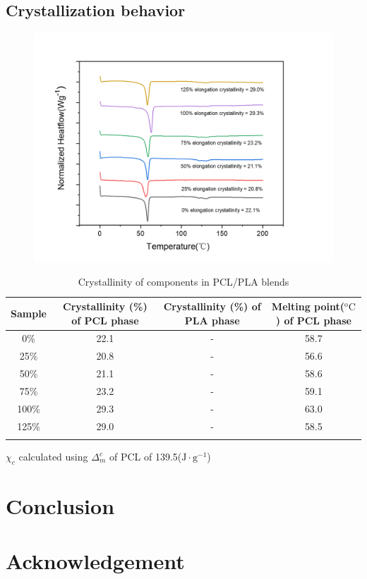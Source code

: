 \documentclass{article}%
\begin{document}
    \subsection{Crystallization behavior}
    \begin{figure} %
      \includegraphics[scale = 0.5]{figures/DSC_result_1.png}
    \end{figure}
    \label{sec:result_and_Analysis}
    \renewcommand{\tablename}{\textbf{Table}}
    \captionsetup[table]{labelsep = period}
    \begin{table} %
      \caption{Crystallinity of components in PCL/PLA blends}
      \begin{tabular}{cccc}
      \toprule
      Sample & Crystallinity (\%) of PCL phase & Crystallinity (\%) of PLA phase & Melting point($\mathrm{^o C}$) of PCL phase\\
      \midrule
      0\% & 22.1 & - & 58.7\\
      25\% & 20.8 & - & 56.6\\
      50\% & 21.1 & - & 58.6\\
      75\% & 23.2 & - & 59.1\\
      100\% & 29.3 & - & 63.0 \\
      125\% & 29.0 & - & 58.5 \\
      \bottomrule
      \label{DSC_result_table}
      \end{tabular}
      $\chi_c $ calculated using $\Delta_m^c$ of PCL of 139.5($\mathrm{J\cdot g^{-1}}$)
    \end{table}
  \section{Conclusion} %
  \label{sec:conclusion}
  
  \section{Acknowledgement} %
  \label{sec:acknowledgement}
  
  
  
\end{document}

